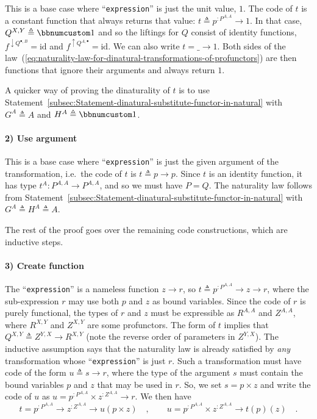 This is a base case where \textsf{``}\lstinline!expression!\textsf{''} is just the
unit value, $1$. The code of $t$ is a constant function that always
returns that value: $t\triangleq p^{:P^{A,A}}\rightarrow1$. In that
case, $Q^{X,Y}\triangleq\bbnum 1$ and so the liftings for $Q$ consist
of identity functions, $f^{\downarrow Q^{\bullet,B}}=\text{id}$ and
$f^{\uparrow Q^{A,\bullet}}=\text{id}$. We can also write $t=\_\rightarrow1$.
Both sides of the law~(\ref{eq:naturality-law-for-dinatural-transformations-of-profunctors})
are then functions that ignore their arguments and always return $1$.

A quicker way of proving the dinaturality of $t$ is to use Statement~\ref{subsec:Statement-dinatural-substitute-functor-in-natural}
with $G^{A}\triangleq A$ and $H^{A}\triangleq\bbnum 1$.

\paragraph{2) Use argument }

This is a base case where \textsf{``}\lstinline!expression!\textsf{''} is just the
given argument of the transformation, i.e.~the code of $t$ is $t\triangleq p\rightarrow p$.
Since $t$ is an identity function, it has type $t^{A}:P^{A,A}\rightarrow P^{A,A}$,
and so we must have $P=Q$. The naturality law follows from Statement~\ref{subsec:Statement-dinatural-substitute-functor-in-natural}
with $G^{A}\triangleq H^{A}\triangleq A$.

The rest of the proof goes over the remaining code constructions,
which are inductive steps.

\paragraph{3) Create function}

The \textsf{``}\lstinline!expression!\textsf{''} is a nameless function $z\rightarrow r$,
so $t\triangleq p^{:P^{A,A}}\rightarrow z\rightarrow r$, where the
sub-expression $r$ may use both $p$ and $z$ as bound variables.
Since the code of $r$ is purely functional, the types of $r$ and
$z$ must be expressible as $R^{A,A}$ and $Z^{A,A}$, where $R^{X,Y}$
and $Z^{X,Y}$ are some profunctors. The form of $t$ implies that
$Q^{X,Y}\triangleq Z^{Y,X}\rightarrow R^{X,Y}$ (note the reverse
order of parameters in $Z^{Y,X}$). The inductive assumption says
that the naturality law is already satisfied by \emph{any} transformation
whose \textsf{``}\lstinline!expression!\textsf{''} is just $r$. Such a transformation
must have code of the form $u\triangleq s\rightarrow r$, where the
type of the argument $s$ must contain the bound variables $p$ and
$z$ that may be used in $r$. So, we set $s=p\times z$ and write
the code of $u$ as $u=p^{:P^{A,A}}\times z^{:Z^{A,A}}\rightarrow r$.
We then have
\begin{equation}
t=p^{:P^{A,A}}\rightarrow z^{:Z^{A,A}}\rightarrow u(p\times z)\quad,\quad\quad u=p^{:P^{A,A}}\times z^{:Z^{A,A}}\rightarrow t(p)(z)\quad.\label{eq:dinaturality-u-function-type-derivation0}
\end{equation}

